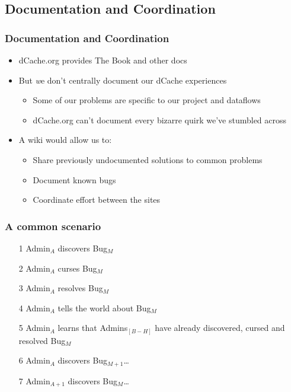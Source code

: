 \documentclass{beamer}
\begin{document}
\subsection{Documentation and Coordination}
\begin{frame}
\frametitle{Documentation and Coordination}
\begin{itemize}
    \item dCache.org provides The Book and other docs
    \item But {\emph we} don't centrally document our dCache experiences
    \begin{itemize}
        \item Some of our problems are specific to our project and dataflows
        \item dCache.org can't document every bizarre quirk we've stumbled across
    \end{itemize}
    \item A wiki would allow us to:
    \begin{itemize}
        \item Share previously undocumented solutions to common problems
        \item Document known bugs
        \item Coordinate effort between the sites
    \end{itemize}
\end{itemize}


\end{frame}

\begin{frame}
\frametitle{A common scenario}
\begin{itemize}
    \item[1] Admin\ensuremath{_A} discovers Bug\ensuremath{_M}
    \item[2] Admin\ensuremath{_A} curses Bug\ensuremath{_M}
    \item[3] Admin\ensuremath{_A} resolves Bug\ensuremath{_M}
    \item[4] Admin\ensuremath{_A} tells the world about Bug\ensuremath{_M}
    \item[5] Admin\ensuremath{_A} learns that Admins\ensuremath{_{[B-H]}} have already discovered, cursed and resolved Bug\ensuremath{_M}
    \item[6] Admin\ensuremath{_A} discovers Bug\ensuremath{_{M+1}}\dots{}
    \item[7] Admin\ensuremath{_{A+1}} discovers Bug\ensuremath{_M}\dots{}
\end{itemize}


\end{frame}
\end{document}
